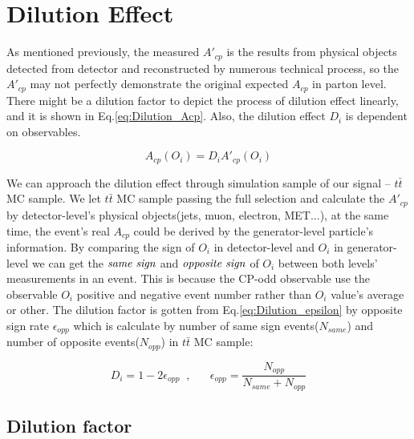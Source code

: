 

\section{Dilution Effect}
\label{sec:Dilution}
	
	As mentioned previously, the measured $A'_{cp}$ is the results from physical objects detected from detector and reconstructed by numerous technical process, so the $A'_{cp}$ may not perfectly demonstrate the original expected $A_{cp}$ in parton level. There might be a dilution factor to depict the process of dilution effect linearly, and it is shown in Eq.\ref{eq:Dilution_Acp}. Also, the dilution effect $D_i$ is dependent on observables.

	\begin{equation}
	A_{cp}(O_i) = D_i A'_{cp}(O_i)
	\label{eq:Dilution_Acp}
	\end{equation}
	\FloatBarrier

	We can approach the dilution effect through simulation sample of our signal -- $t\bar{t}$ MC sample. We let $t\bar{t}$ MC sample passing the full selection and calculate the $A'_{cp}$ by detector-level's physical objects(jets, muon, electron, MET...), at the same time, the event's real $A_{cp}$ could be derived by the generator-level particle's information. By comparing the sign of $O_i$ in detector-level and $O_i$ in generator-level we can get the $\emph{same sign}$ and $\emph{opposite sign}$ of $O_i$ between both levels' measurements in an event. This is because the CP-odd observable use the observable $O_i$ positive and negative event number rather than $O_i$ value's average or other. The dilution factor is gotten from Eq.\ref{eq:Dilution_epsilon} by opposite sign rate $\epsilon_{opp}$ which is calculate by number of same sign events($N_{same}$) and number of opposite events($N_{opp}$) in $t\bar{t}$ MC sample:

	\begin{equation}
	D_i = 1 - 2 \epsilon_{opp} \; \; , \; \; \; \; \; \; \epsilon_{opp} = \frac{N_{opp}}{N_{same} + N_{opp}}
	\label{eq:Dilution_epsilon}
	\end{equation}
	\FloatBarrier

	\subsection{Dilution factor}
	\label{Dilution:dilution_factor}
		
